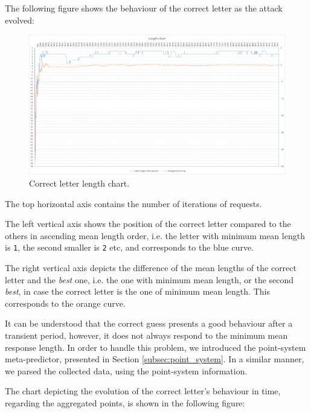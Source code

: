 The following figure shows the behaviour of the correct letter as the attack
evolved:

\begin{figure}[H] \caption{Correct letter length chart.}
\includegraphics[width=1\textwidth]{diagrams/point_system_chart_1.png}\end{figure}

The top horizontal axis contains the number of iterations of requests.

The left vertical axis shows the position of the correct letter compared to the
others in ascending mean length order, i.e. the letter with minimum mean length
is \texttt{1}, the second smaller is \texttt{2} etc, and corresponds to the blue
curve.

The right vertical axis depicts the difference of the mean lengths of the
correct letter and the \textit{best} one, i.e. the one with minimum mean length,
or the second \textit{best}, in case the correct letter is the one of minimum
mean length.  This corresponds to the orange curve.

It can be understood that the correct guess presents a good behaviour after a
transient period, however, it does not always respond to the minimum mean
response length. In order to handle this problem, we introduced the point-system meta-predictor,
presented in Section \ref{subsec:point_system}. In a similar manner, we parsed
the collected data, using the point-system information.

The chart depicting the evolution of the correct letter's
behaviour in time, regarding the aggregated points, is shown in the following
figure:


